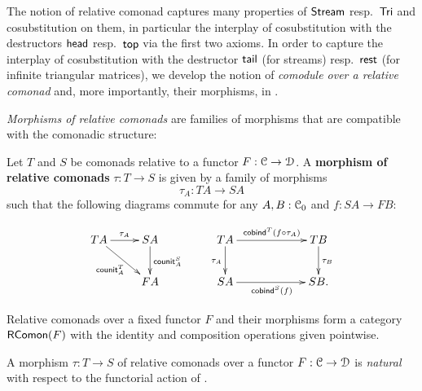 \documentclass[a4paper,USenglish]{lipics}
\newcommand{\fat}[1]{\textbf{#1}}
\begin{document}
The notion of relative comonad captures many properties of $\mathsf{Stream}$ resp.\ $\mathsf{Tri}$ and cosubstitution on them, in particular the interplay
of cosubstitution with the destructors $\mathsf{head}$ resp.\ $\mathsf{top}$ via the first two axioms.
In order to  capture the interplay 
of cosubstitution  with the destructor $\mathsf{tail}$ (for streams) resp.\ $\mathsf{rest}$ (for infinite triangular matrices), 
we develop the notion of \emph{comodule over a relative comonad} and, more importantly, their morphisms, in . 








\emph{Morphisms of relative comonads} are families of morphisms that are compatible with the comonadic structure:

\begin{defn}%
\label{def:comonad_morphism}
 Let $T$ and $S$ be comonads relative to a functor $F : {\mathcal{C}} \to \mathcal{D}$. A \fat{morphism of relative comonads} $\tau : T \to S$
  is given by a family of morphisms \[\tau_A : TA \to SA\] such that the following diagrams commute
  for any  $A,B : {\mathcal{C}}_0$ and $f : SA\to FB$:
     
\[ \begin{xy}
    \xymatrix {
                       TA \ar[r]^{\tau_A} \ar[rd]_{\counit^T_A}  &   SA \ar[d]^{\counit^S_A}\\
                            &    FA
   }
   \end{xy}
% 
% 
%   
% 
\qquad
\begin{xy}
     \xymatrix@C=6em{
                     TA \ar[d]_{\tau_A}   \ar[r]^{\cobind^T(\comp{\tau_A}{f})} & TB \ar[d]^{\tau_B}\\
                     SA \ar[r]_{\cobind^S(f)} & SB .
     }  
   \end{xy}
\]

\end{defn}

Relative comonads over a fixed functor $F$ and their morphisms form a category $\mathsf{RComon}(F)$ with the identity and composition operations given pointwise.

\begin{rem}
A morphism $\tau : T\to S$ of relative comonads over a functor $F:{\mathcal{C}}\to\mathcal{D}$ is  \emph{natural}
with respect to the functorial action of .
\end{rem}
\end{document}
